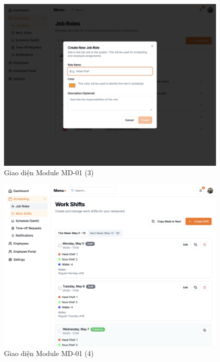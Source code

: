 \begin{figure}[H]
    \centering
    \includegraphics[width=\linewidth]{Sections/hien_thuc/img/1.3.png}
    \vspace{0.5cm}
    \caption{Giao diện Module MD-01 (3)}
    \label{fig:gantt_module_md01_3}
\end{figure}

\begin{figure}[H]
    \centering
    \includegraphics[width=\linewidth]{Sections/hien_thuc/img/1.4.png}
    \vspace{0.5cm}
    \caption{Giao diện Module MD-01 (4)}
    \label{fig:gantt_module_md01_4}
\end{figure}

